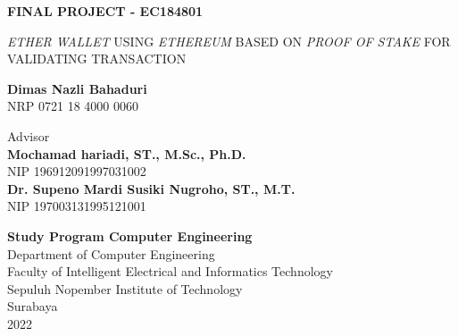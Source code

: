 \begin{flushleft}
  \fontsize{14pt}{17}
  \selectfont
  \textbf{FINAL PROJECT - EC184801}
\end{flushleft}


\vspace{5ex}

\begin{flushleft}
  \fontsize{18pt}{22}
  \selectfont
  \emph{ETHER WALLET} USING \emph{ETHEREUM} BASED ON \emph{PROOF OF STAKE} FOR VALIDATING TRANSACTION
\end{flushleft}

\vspace{6ex}

\begin{flushleft}
  \fontsize{14pt}{17}
  \selectfont
  \textbf{Dimas Nazli Bahaduri}
  \\
  NRP 0721 18 4000 0060
\end{flushleft}

\vspace{6ex}

\begin{flushleft}
  \fontsize{14pt}{17}
  \selectfont
  Advisor \\
  \textbf{Mochamad hariadi, ST., M.Sc., Ph.D.} \\
  NIP 196912091997031002 \\
  \textbf{Dr. Supeno Mardi Susiki Nugroho, ST., M.T.} \\
  NIP 197003131995121001 \\
\end{flushleft}

\vspace{6ex}

\begin{flushleft}
  \fontsize{12pt}{15}
  \selectfont
  \textbf{Study Program Computer Engineering}\\
  Department of Computer Engineering\\
  Faculty of Intelligent Electrical and Informatics Technology\\
  Sepuluh Nopember Institute of Technology\\
  Surabaya\\
  2022
\end{flushleft}
